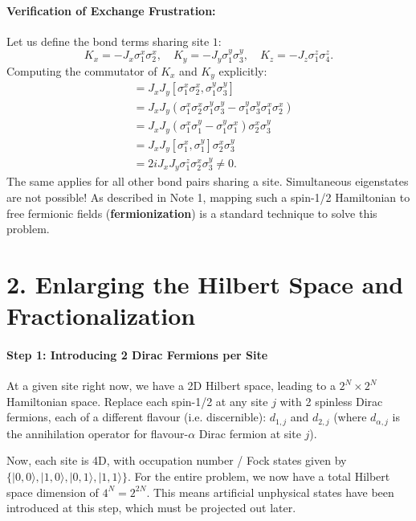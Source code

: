 \documentclass[11pt,a4paper]{article}
\begin{document}
\paragraph{Verification of Exchange Frustration:}
Let us define the bond terms sharing site $1$:
\begin{equation}
    K_x = -J_x \sigma_1^x \sigma_2^x, \quad K_y = -J_y \sigma_1^y \sigma_3^y, \quad K_z = -J_z \sigma_1^z \sigma_4^z.
\end{equation}
Computing the commutator of $K_x$ and $K_y$ explicitly:
\begin{align}
    [K_x, K_y] &= J_x J_y [\sigma_1^x \sigma_2^x, \sigma_1^y \sigma_3^y] \nonumber \\
    &= J_x J_y \left( \sigma_1^x \sigma_2^x \sigma_1^y \sigma_3^y - \sigma_1^y \sigma_3^y \sigma_1^x \sigma_2^x \right) \nonumber \\
    &= J_x J_y \left( \sigma_1^x \sigma_1^y - \sigma_1^y \sigma_1^x \right) \sigma_2^x \sigma_3^y \nonumber \\
    &= J_x J_y [\sigma_1^x, \sigma_1^y] \sigma_2^x \sigma_3^y \nonumber \\
    &= 2i J_x J_y \sigma_1^z \sigma_2^x \sigma_3^y \neq 0.
\end{align}
The same applies for all other bond pairs sharing a site. Simultaneous eigenstates are not possible! As described in Note 1, mapping such a spin-1/2 Hamiltonian to free fermionic fields (\textbf{fermionization}) is a standard technique to solve this problem.


\section*{2. Enlarging the Hilbert Space and Fractionalization}

\paragraph{Step 1: Introducing 2 Dirac Fermions per Site}
At a given site right now, we have a 2D Hilbert space, leading to a $2^N \times 2^N$ Hamiltonian space. Replace each spin-1/2 at any site $j$ with 2 spinless Dirac fermions, each of a different flavour (i.e. discernible): $d_{1,j}$ and $d_{2,j}$ (where $d_{\alpha,j}$ is the annihilation operator for flavour-$\alpha$ Dirac fermion at site $j$).

Now, each site is 4D, with occupation number / Fock states given by $\{|0,0\rangle, |1,0\rangle, |0,1\rangle, |1,1\rangle\}$.
For the entire problem, we now have a total Hilbert space dimension of $4^N = 2^{2N}$. This means artificial unphysical states have been introduced at this step, which must be projected out later.
\end{document}
